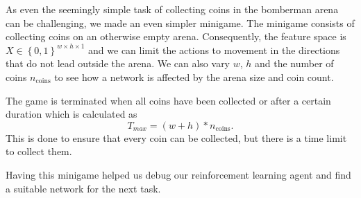 
\label{ch:minigame}
As even the seemingly simple task of collecting coins in the bomberman arena can be challenging, we made an even simpler minigame. The minigame consists of collecting coins on an otherwise empty arena. Consequently, the feature space is $X\in\left\{0,1\right\}^{w\times h \times 1}$ and we can limit the actions to movement in the directions that do not lead outside the arena. We can also vary $w$, $h$ and the number of coins $n_{\text{coins}}$ to see how a network is affected by the arena size and coin count.

The game is terminated when all coins have been collected or after a certain duration which is calculated as $$T_{max}=(w+h)*n_{\text{coins}}.$$
This is done to ensure that every coin can be collected, but there is a time limit to collect them.

Having this minigame helped us debug our reinforcement learning agent and find a suitable network for the next task.
